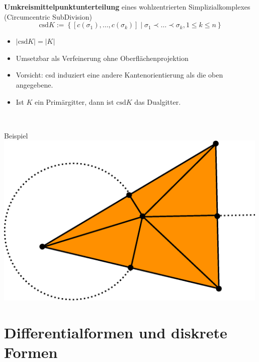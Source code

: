 \documentclass{beamer}
\begin{document}
  \begin{frame}
    \begin{block}{\textbf{Umkreismittelpunktunterteilung} eines wohlzentrierten Simplizialkomplexes (Circumcentric SubDivision)}
      \[ \text{csd}K := \left\{ \left[c(\sigma_{1}),\ldots,c(\sigma_{k})\right] \middle| \sigma_{1} \prec \ldots \prec \sigma_{k}, 1 \le k \le n \right\} \]
    \end{block}
    \begin{minipage}{0.5\textwidth}
      \begin{itemize}
        \item<2-> \( |\text{csd}K| = |K| \)
        \item<3-> Umsetzbar als Verfeinerung ohne Oberflächenprojektion
        \item<4-> Vorsicht: csd induziert eine andere Kantenorientierung als die oben angegebene.
        \item<5-> Ist \( K \) ein Primärgitter, dann ist \( \text{csd}K \) das Dualgitter.
      \end{itemize}
    \end{minipage} \, 
    \begin{minipage}{0.45\textwidth}
      \begin{block}{Beispiel}
        \centering\includegraphics[width=0.99\textwidth]{bilder/inkscape/subdivision2.eps}
      \end{block}
    \end{minipage}
  \end{frame}

  
  \section{Differentialformen und diskrete Formen}
\end{document}
